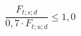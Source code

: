 \documentclass[12pt]{article}
\begin{document}
\begin{displaymath}
\frac {F_{t;s;d}} {0,7 \cdot F_{t;u;d}} \leq 1,0
\end{displaymath}
\end{document}
